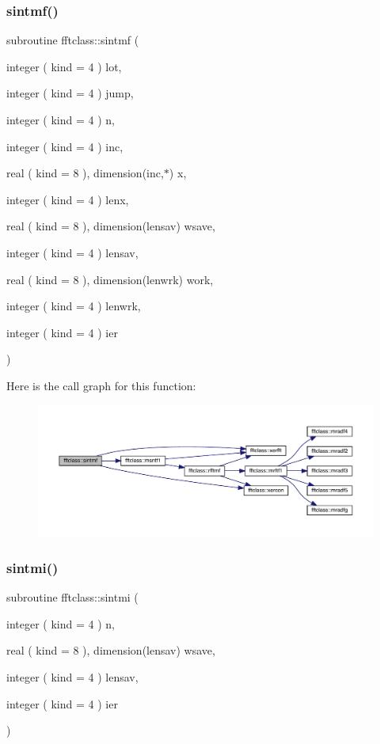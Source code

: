 \subsubsection{\texorpdfstring{sintmf()}{sintmf()}}
{\footnotesize\ttfamily subroutine fftclass\+::sintmf (\begin{DoxyParamCaption}\item[{integer ( kind = 4 )}]{lot,  }\item[{integer ( kind = 4 )}]{jump,  }\item[{integer ( kind = 4 )}]{n,  }\item[{integer ( kind = 4 )}]{inc,  }\item[{real ( kind = 8 ), dimension(inc,$\ast$)}]{x,  }\item[{integer ( kind = 4 )}]{lenx,  }\item[{real ( kind = 8 ), dimension(lensav)}]{wsave,  }\item[{integer ( kind = 4 )}]{lensav,  }\item[{real ( kind = 8 ), dimension(lenwrk)}]{work,  }\item[{integer ( kind = 4 )}]{lenwrk,  }\item[{integer ( kind = 4 )}]{ier }\end{DoxyParamCaption})}

Here is the call graph for this function\+:\nopagebreak
\begin{figure}[H]
\begin{center}
\leavevmode
\includegraphics[width=350pt]{namespacefftclass_a497c6a39bac7daa7973b53cb00ffd6c3_cgraph}
\end{center}
\end{figure}
\mbox{\label{namespacefftclass_a9b28ecda04690fe2a4425da2b5625e4d}} 
\subsubsection{\texorpdfstring{sintmi()}{sintmi()}}
{\footnotesize\ttfamily subroutine fftclass\+::sintmi (\begin{DoxyParamCaption}\item[{integer ( kind = 4 )}]{n,  }\item[{real ( kind = 8 ), dimension(lensav)}]{wsave,  }\item[{integer ( kind = 4 )}]{lensav,  }\item[{integer ( kind = 4 )}]{ier }\end{DoxyParamCaption})}

